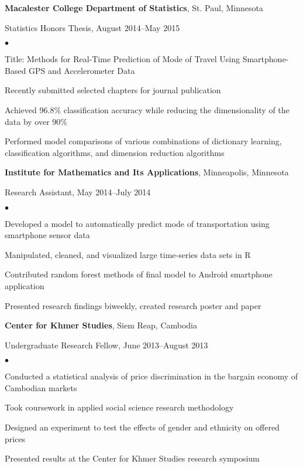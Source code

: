 \documentclass[margin,centered]{res}
\newenvironment{list1}{
  \begin{list}{\ding{113}}{%
      \setlength{\itemsep}{0in}
      \setlength{\parsep}{0in} \setlength{\parskip}{0in}
      \setlength{\topsep}{0in} \setlength{\partopsep}{0in}
      \setlength{\leftmargin}{0.17in}}}{\end{list}}
\newenvironment{list2}{
  \begin{list}{$\bullet$}{%
      \setlength{\itemsep}{0in}
      \setlength{\parsep}{0in} \setlength{\parskip}{0in}
      \setlength{\topsep}{0in} \setlength{\partopsep}{0in}
      \setlength{\leftmargin}{0.2in}}}{\end{list}}
\begin{document}
\begin{resume}
{\bf Macalester College Department of Statistics}, St. Paul, Minnesota
\begin{list1}
\item[] 
Statistics Honors Thesis, August 2014--May 2015
\begin{list2}
\vspace*{.05in}
\item
Title: Methods for Real-Time Prediction of Mode of Travel Using Smartphone-Based GPS and Accelerometer Data
\item Recently submitted selected chapters for journal publication
\item Achieved 96.8\% classification accuracy while reducing the dimensionality of the data by over 90\%
\item Performed model comparisons of various combinations of dictionary learning, classification algorithms, and dimension reduction algorithms
\end{list2} 
\end{list1}

{\bf Institute for Mathematics and Its Applications}, Minneapolis, Minnesota
\begin{list1}
\item[] 
Research Assistant, May 2014--July 2014
\begin{list2}
\vspace*{.05in}
\item
 Developed a model to automatically predict mode of transportation using smartphone sensor data
 \item Manipulated, cleaned, and visualized large time-series data sets in R
\item Contributed random forest methods of final model to Android smartphone application
 \item Presented research findings biweekly, created research poster and paper
\end{list2} 
\end{list1}


{\bf Center for Khmer Studies}, Siem Reap, Cambodia
\begin{list1}
\item[] 
Undergraduate Research Fellow, June 2013--August 2013
\begin{list2}
\vspace*{.05in}
\item Conducted a statistical analysis of price discrimination in the bargain economy of Cambodian markets
\item Took coursework in applied social science research methodology
\item Designed an experiment to test the effects of gender and ethnicity on offered prices
\item Presented results at the Center for Khmer Studies research symposium
\end{list2} 
\end{list1}


\end{resume}
\end{document}
